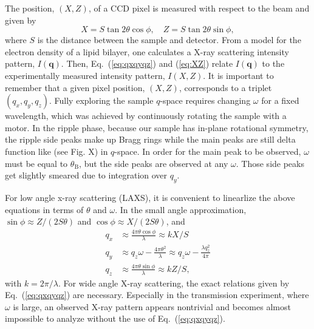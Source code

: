 \documentclass[12pt,letterpaper]{article}
\begin{document}
The position, $(X,Z)$, of a CCD pixel is measured with respect to the beam 
and given by
\begin{equation}
  X = S \tan 2\theta \cos\phi, \quad Z = S \tan 2\theta \sin\phi,
  \label{eq:XZ}
\end{equation} 
where $S$ is the distance between the sample and detector.
From a model for the electron density of a lipid bilayer, one calculates
a X-ray scattering intensity pattern, $I(\mathbf{q})$. Then, Eq.~(\ref{eq:qxqyqz})
and (\ref{eq:XZ}) relate $I(\mathbf{q})$ to the experimentally measured
intensity pattern, $I(X,Z)$. It is important to remember that a given pixel
position, $(X,Z)$, corresponds to a triplet $(q_x, q_y, q_z)$. Fully exploring 
the sample $q$-space requires changing $\omega$ for a fixed wavelength, which was
achieved by continuously rotating the sample with a motor. In the ripple phase, 
because our sample has in-plane rotational symmetry,
the ripple side peaks make up Bragg rings while the main peaks are still 
delta function like (see Fig. X) in $q$-space. In order for the main peak to be
observed, $\omega$ must be equal to $\theta_\mathrm{B}$, but the side peaks
are observed at any $\omega$. Those side peaks get slightly smeared due to 
integration over $q_y$.

For low angle x-ray scattering (LAXS), it is convenient to linearlize the above
equations in terms of $\theta$ and $\omega$. In the small angle approximation, 
$\sin\phi \approx Z/(2S\theta)$ and $\cos\phi \approx X/(2S\theta)$, and
\begin{align}
  q_x &\approx \frac{4\pi\theta\cos\phi}{\lambda} \approx kX/S \nonumber\\
  q_y &\approx q_z\omega -\frac{4\pi\theta^2}{\lambda} \approx q_z\omega - \frac{\lambda q_z^2}{4\pi}\nonumber\\
  q_z &\approx \frac{4\pi\theta\sin\phi}{\lambda} \approx kZ/S,
  \label{eq:qxqyqz_small}
\end{align}
with $k=2\pi/\lambda$. For wide angle X-ray scattering, the exact relations given
by Eq.~(\ref{eq:qxqyqz}) are necessary. Especially in the transmission experiment,
where $\omega$ is large, an observed X-ray pattern appears nontrivial and becomes
almost impossible to analyze without the use of Eq.~(\ref{eq:qxqyqz}).


\end{document}
